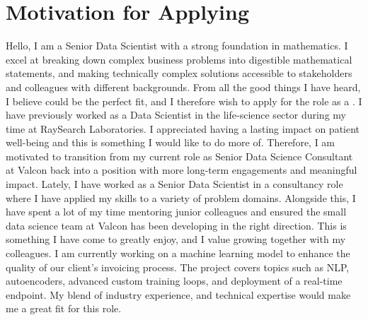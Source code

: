 \section{Motivation for Applying}
Hello, I am a Senior Data Scientist with a strong foundation in mathematics.
I excel at breaking down complex business problems into digestible mathematical statements, and making technically complex solutions accessible to stakeholders and colleagues with different backgrounds.
From all the good things I have heard, I believe \company{} could be the perfect fit, and I therefore wish to apply for the role as a \role{}. \newpar I have previously worked as a Data Scientist in the life-science sector during my time at RaySearch Laboratories.
I appreciated having a lasting impact on patient well-being and this is something I would like to do more of.
Therefore, I am motivated to transition from my current role as Senior Data Science Consultant at Valcon back into a position with more long-term engagements and meaningful impact. \newpar Lately, I have worked as a Senior Data Scientist in a consultancy role where I have applied my skills to a variety of problem domains.
Alongside this, I have spent a lot of my time mentoring junior colleagues and ensured the small data science team at Valcon has been developing in the right direction.
This is something I have come to greatly enjoy, and I value growing together with my colleagues. \newpar I am currently working on a machine learning model to enhance the quality of our client's invoicing process.
The project covers topics such as NLP, autoencoders, advanced custom training loops, and deployment of a real-time endpoint.
My blend of industry experience, and technical expertise would make me a great fit for this role.